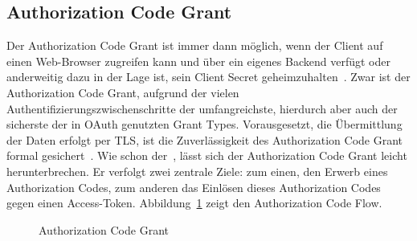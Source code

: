 \subsection{Authorization Code Grant}\label{ssec:authcode} Der Authorization
Code Grant ist immer dann möglich, wenn der Client auf einen Web-Browser
zugreifen kann und über ein eigenes Backend verfügt oder anderweitig dazu in der
Lage ist, sein Client Secret geheimzuhalten~. Zwar
ist der Authorization Code Grant, aufgrund der vielen
Authentifizierungszwischenschritte der umfangreichste, hierdurch aber auch der
sicherste der in \gls{OAuth} genutzten \glspl{Grant Type}. Vorausgesetzt, die
Übermittlung der Daten erfolgt per \gls{TLS}, ist die Zuverlässigkeit des
Authorization Code Grant formal gesichert~\cite{Chari.2011}. Wie schon
der~, lässt sich der Authorization Code Grant leicht
herunterbrechen. Er verfolgt zwei zentrale Ziele: zum einen, den Erwerb eines
Authorization Codes, zum anderen das Einlösen dieses Authorization Codes gegen
einen Access-Token. Abbildung~\ref{fig: Authorization Code Grant} zeigt den
Authorization Code Flow.

\begin{figure}[h]
    \scalebox{.5}{
        
    }
    \caption{Authorization Code
    Grant~\protect{}}\label{fig: Authorization Code Grant}
\end{figure}

